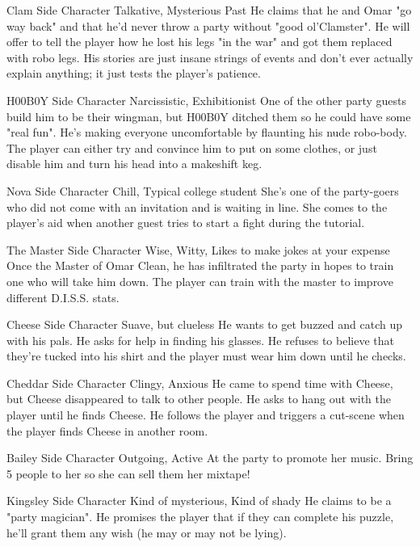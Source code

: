 {Clam}
{Side Character}
{Talkative, Mysterious Past}
{He claims that he and Omar "go way back" and that he'd never throw a party without "good ol'Clamster".}
{He will offer to tell the player how he lost his legs "in the war" and got them replaced with robo legs. His stories are just insane strings of events and don't ever actually explain anything; it just tests the player's patience.}

{H00B0Y}
{Side Character}
{Narcissistic, Exhibitionist}
{One of the other party guests build him to be their wingman, but H00B0Y ditched them so he could have some "real fun".}
{He's making everyone uncomfortable by flaunting his nude robo-body. The player can either try and convince him to put on some clothes, or just disable him and turn his head into a makeshift keg.}

{Nova}
{Side Character}
{Chill, Typical college student}
{She's one of the party-goers who did not come with an invitation and is waiting in line.}
{She comes to the player's aid when another guest tries to start a fight during the tutorial.}

{The Master}
{Side Character}
{Wise, Witty, Likes to make jokes at your expense}
{Once the Master of Omar Clean, he has infiltrated the party in hopes to train one who will take him down.}
{The player can train with the master to improve different D.I.S.S. stats.}

{Cheese}
{Side Character}
{Suave, but clueless}
{He wants to get buzzed and catch up with his pals.}
{He asks for help in finding his glasses. He refuses to believe that they're tucked into his shirt and the player must wear him down until he checks.}

{Cheddar}
{Side Character}
{Clingy, Anxious}
{He came to spend time with Cheese, but Cheese disappeared to talk to other people.}
{He asks to hang out with the player until he finds Cheese. He follows the player and triggers a cut-scene when the player finds Cheese in another room.}

{Bailey}
{Side Character}
{Outgoing, Active}
{At the party to promote her music.}
{Bring 5 people to her so she can sell them her mixtape!}

{Kingsley}
{Side Character}
{Kind of mysterious, Kind of shady}
{He claims to be a "party magician".}
{He promises the player that if they can complete his puzzle, he'll grant them any wish (he may or may not be lying).}

